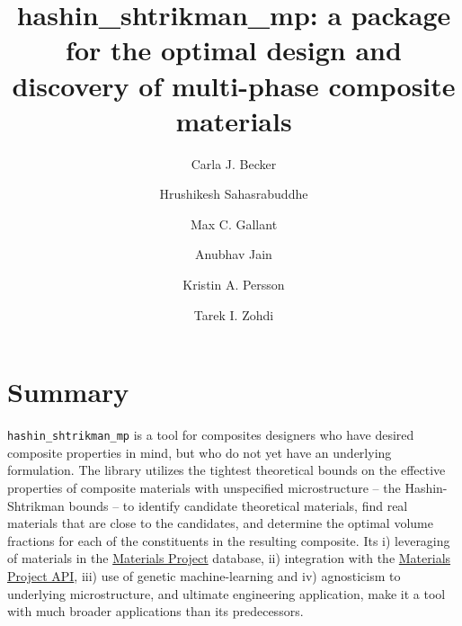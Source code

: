 \documentclass[letterpaper,12pt]{formatfile}
\begin{document}
\setlength{\fboxsep}{1.0mm}
\noindent

\title{hashin\_shtrikman\_mp: a package for the optimal design and discovery of multi-phase composite materials}

\author[1]{Carla J. Becker}
\author[2,3]{Hrushikesh Sahasrabuddhe}
\author[2,4]{Max C. Gallant}
\author[3]{Anubhav Jain}
\author[2,4]{Kristin A. Persson}
\author[1]{Tarek I. Zohdi}


\maketitle
  
\section{Summary} \label{sec:summary}

\verb|hashin_shtrikman_mp| is a tool for composites designers who have desired composite properties in mind, but who do not yet have an underlying formulation. The library utilizes the tightest theoretical bounds on the effective properties of composite materials with unspecified microstructure – the Hashin-Shtrikman bounds – to identify candidate theoretical materials, find real materials that are close to the candidates, and determine the optimal volume fractions for each of the constituents in the resulting composite. Its i) leveraging of materials in the \href{https://next-gen.materialsproject.org/}{Materials Project} database, ii) integration with the \href{https://next-gen.materialsproject.org/api}{Materials Project API}, iii) use of genetic machine-learning and iv) agnosticism to underlying microstructure, and ultimate engineering application, make it a tool with much broader applications than its predecessors. 
\end{document}
